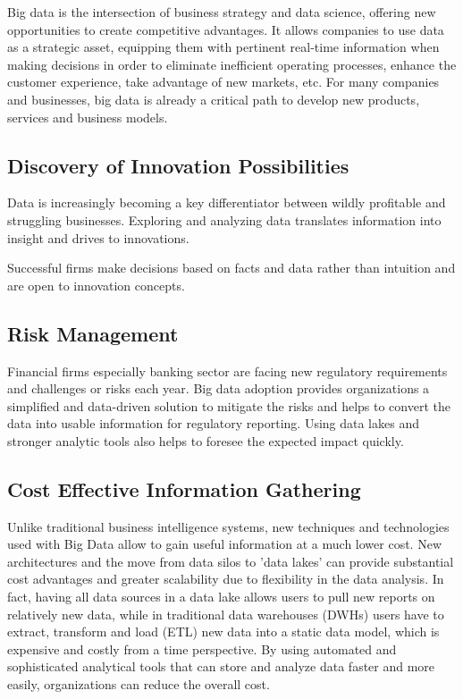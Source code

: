 \documentclass[sigconf]{acmart}
\begin{document}
Big data is the intersection of business strategy and data science, offering new opportunities to create competitive advantages. It allows companies to use data as a strategic asset, equipping them with pertinent real-time information when making decisions in order to eliminate inefficient operating processes, enhance the customer experience, take advantage of new markets, etc.
For many companies and businesses, big data is already a critical path to develop new products, services and business models\cite{accenture-next-generation-financial}.

\subsection{Discovery of Innovation Possibilities}
Data is increasingly becoming a key differentiator between wildly profitable and struggling businesses. Exploring and analyzing data translates information into insight and drives to innovations\cite{bigdata-innovations}.

Successful firms make decisions based on facts and data rather than intuition and are open to innovation concepts. 


\subsection{Risk Management}
Financial firms especially banking sector are facing new regulatory requirements and challenges or risks each year. Big data adoption provides organizations a simplified and data-driven solution to mitigate the risks and helps to convert the data into usable information for regulatory reporting. Using data lakes and stronger analytic tools   also helps to foresee the expected impact quickly\cite{the-real-world-use-of-big-data-935}.

\subsection{Cost Effective Information Gathering}

Unlike traditional business intelligence systems, new techniques and technologies used with Big Data allow to gain useful information at a much lower cost. New architectures and the move from data silos to 'data lakes' can provide substantial cost advantages and greater scalability due to flexibility in the data analysis. In fact, having all data sources in a data lake allows users to pull new reports on relatively new data, while in traditional data warehouses (DWHs) users have to extract, transform and load (ETL) new data into a static data model, which is expensive and costly from a time perspective. By using automated and sophisticated analytical tools that can store and analyze data faster and more easily, organizations can reduce the overall cost\cite{accenture-next-generation-financial}.
\end{document}

